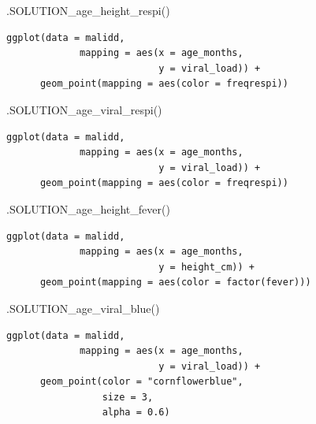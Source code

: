 \documentclass[
  letterpaper,
  DIV=11,
  numbers=noendperiod]{scrreprt}
\newenvironment{Shaded}{\begin{snugshade}}{\end{snugshade}}
\newcommand{\FunctionTok}[1]{\textcolor[rgb]{0.28,0.35,0.67}{#1}}
\newcommand{\NormalTok}[1]{\textcolor[rgb]{0.00,0.23,0.31}{#1}}
\begin{document}
\begin{Shaded}
\begin{Highlighting}[]
\FunctionTok{.SOLUTION\_age\_height\_respi}\NormalTok{()}
\end{Highlighting}
\end{Shaded}

\begin{verbatim}
ggplot(data = malidd, 
             mapping = aes(x = age_months, 
                           y = viral_load)) + 
      geom_point(mapping = aes(color = freqrespi))
\end{verbatim}

\begin{Shaded}
\begin{Highlighting}[]
\FunctionTok{.SOLUTION\_age\_viral\_respi}\NormalTok{() }
\end{Highlighting}
\end{Shaded}

\begin{verbatim}
ggplot(data = malidd, 
             mapping = aes(x = age_months, 
                           y = viral_load)) + 
      geom_point(mapping = aes(color = freqrespi))
\end{verbatim}

\begin{Shaded}
\begin{Highlighting}[]
\FunctionTok{.SOLUTION\_age\_height\_fever}\NormalTok{()}
\end{Highlighting}
\end{Shaded}

\begin{verbatim}
ggplot(data = malidd, 
             mapping = aes(x = age_months, 
                           y = height_cm)) + 
      geom_point(mapping = aes(color = factor(fever)))
\end{verbatim}

\begin{Shaded}
\begin{Highlighting}[]
\FunctionTok{.SOLUTION\_age\_viral\_blue}\NormalTok{()}
\end{Highlighting}
\end{Shaded}

\begin{verbatim}
ggplot(data = malidd, 
             mapping = aes(x = age_months, 
                           y = viral_load)) + 
      geom_point(color = "cornflowerblue",
                 size = 3,
                 alpha = 0.6)
\end{verbatim}
\end{document}
